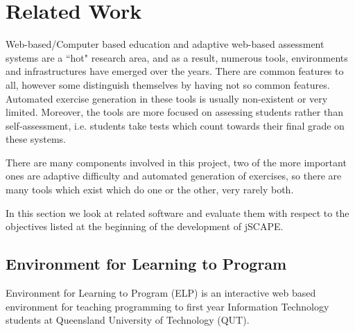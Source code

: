 \chapter{Related Work}




Web-based/Computer based education and adaptive web-based assessment systems are a ``hot" research area, and as a result, numerous tools, environments and infrastructures have emerged over the years. There are common features to all, however some distinguish themselves by having not so common features.
Automated exercise generation in these tools is usually non-existent or very limited. Moreover, the tools are more focused on assessing students rather than self-assessment, i.e. students take tests which count towards their final grade on these systems.\newline

There are many components involved in this project, two of the more important ones are adaptive difficulty and automated generation of exercises, so there are many tools which exist which do one or the other, very rarely both.\newline

In this section we look at related software and evaluate them with respect to the objectives listed at the beginning of the development of jSCAPE.

\section{Environment for Learning to Program}
Environment for Learning to Program (ELP) is an interactive web based environment for teaching programming to first year Information Technology students at Queensland University of Technology (QUT).

